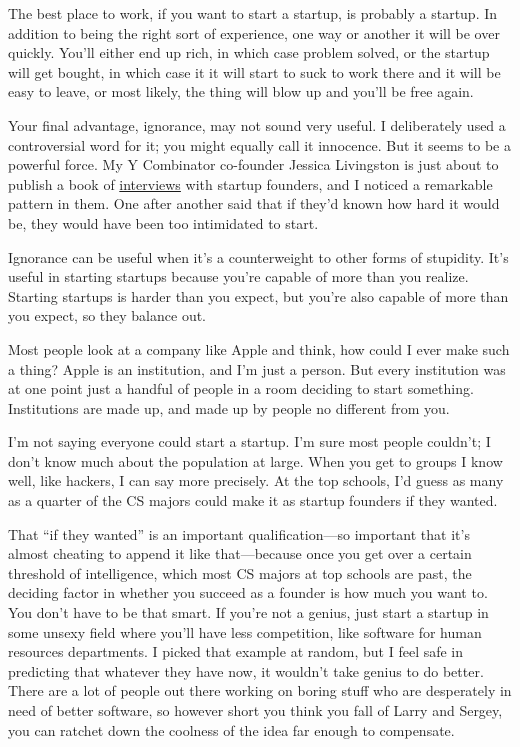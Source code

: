 \documentclass[12pt]{book}
\begin{document}
The best place to work, if you want to start a startup, is probably a
startup. In addition to being the right sort of experience, one way or
another it will be over quickly. You'll either end up rich, in which
case problem solved, or the startup will get bought, in which case it it
will start to suck to work there and it will be easy to leave, or most
likely, the thing will blow up and you'll be free again.

Your final advantage, ignorance, may not sound very useful. I
deliberately used a controversial word for it; you might equally call it
innocence. But it seems to be a powerful force. My Y Combinator
co-founder Jessica Livingston is just about to publish a book of
\href{http://www.amazon.com/gp/product/1590597141}{interviews} with
startup founders, and I noticed a remarkable pattern in them. One after
another said that if they'd known how hard it would be, they would have
been too intimidated to start.

Ignorance can be useful when it's a counterweight to other forms of
stupidity. It's useful in starting startups because you're capable of
more than you realize. Starting startups is harder than you expect, but
you're also capable of more than you expect, so they balance out.

Most people look at a company like Apple and think, how could I ever
make such a thing? Apple is an institution, and I'm just a person. But
every institution was at one point just a handful of people in a room
deciding to start something. Institutions are made up, and made up by
people no different from you.

I'm not saying everyone could start a startup. I'm sure most people
couldn't; I don't know much about the population at large. When you get
to groups I know well, like hackers, I can say more precisely. At the
top schools, I'd guess as many as a quarter of the CS majors could make
it as startup founders if they wanted.

That ``if they wanted'' is an important qualification---so important
that it's almost cheating to append it like that---because once you get
over a certain threshold of intelligence, which most CS majors at top
schools are past, the deciding factor in whether you succeed as a
founder is how much you want to. You don't have to be that smart. If
you're not a genius, just start a startup in some unsexy field where
you'll have less competition, like software for human resources
departments. I picked that example at random, but I feel safe in
predicting that whatever they have now, it wouldn't take genius to do
better. There are a lot of people out there working on boring stuff who
are desperately in need of better software, so however short you think
you fall of Larry and Sergey, you can ratchet down the coolness of the
idea far enough to compensate.
\end{document}
